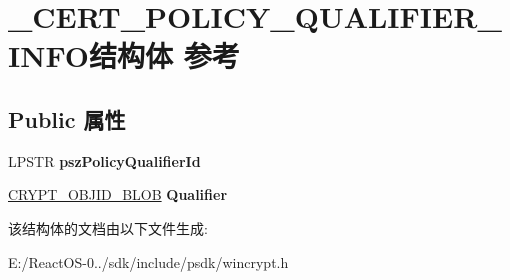 \hypertarget{struct___c_e_r_t___p_o_l_i_c_y___q_u_a_l_i_f_i_e_r___i_n_f_o}{}\section{\+\_\+\+C\+E\+R\+T\+\_\+\+P\+O\+L\+I\+C\+Y\+\_\+\+Q\+U\+A\+L\+I\+F\+I\+E\+R\+\_\+\+I\+N\+F\+O结构体 参考}
\label{struct___c_e_r_t___p_o_l_i_c_y___q_u_a_l_i_f_i_e_r___i_n_f_o}
\subsection*{Public 属性}
\begin{DoxyCompactItemize}
\item 
\mbox{\label{struct___c_e_r_t___p_o_l_i_c_y___q_u_a_l_i_f_i_e_r___i_n_f_o_a4193c1f5e771101e72bf3741d9540ed4}} 
L\+P\+S\+TR {\bfseries psz\+Policy\+Qualifier\+Id}
\item 
\mbox{\label{struct___c_e_r_t___p_o_l_i_c_y___q_u_a_l_i_f_i_e_r___i_n_f_o_a0b02be1374fae4e2d788c849b8446897}} 
\hyperlink{struct___c_r_y_p_t_o_a_p_i___b_l_o_b}{C\+R\+Y\+P\+T\+\_\+\+O\+B\+J\+I\+D\+\_\+\+B\+L\+OB} {\bfseries Qualifier}
\end{DoxyCompactItemize}


该结构体的文档由以下文件生成\+:\begin{DoxyCompactItemize}
\item 
E\+:/\+React\+O\+S-\/0../sdk/include/psdk/wincrypt.\+h\end{DoxyCompactItemize}
